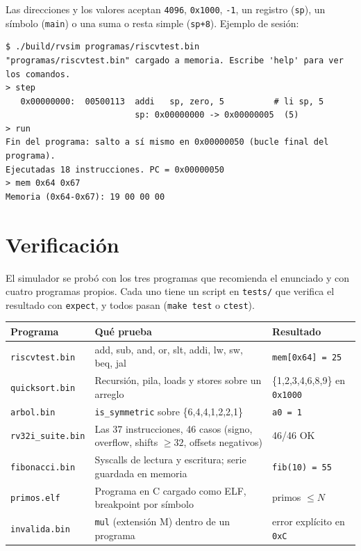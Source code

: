 \documentclass[11pt,a4paper]{article}
\newcommand{\cmd}[1]{\texttt{#1}}
\begin{document}
\noindent Las direcciones y los valores aceptan \cmd{4096}, \cmd{0x1000}, \cmd{-1}, un registro (\cmd{sp}), un
símbolo (\cmd{main}) o una suma o resta simple (\cmd{sp+8}). Ejemplo de sesión:

\begin{lstlisting}
$ ./build/rvsim programas/riscvtest.bin
"programas/riscvtest.bin" cargado a memoria. Escribe 'help' para ver los comandos.
> step
   0x00000000:  00500113  addi   sp, zero, 5          # li sp, 5
                          sp: 0x00000000 -> 0x00000005  (5)
> run
Fin del programa: salto a sí mismo en 0x00000050 (bucle final del programa).
Ejecutadas 18 instrucciones. PC = 0x00000050
> mem 0x64 0x67
Memoria (0x64-0x67): 19 00 00 00
\end{lstlisting}

\section{Verificación}
El simulador se probó con los tres programas que recomienda el enunciado y con cuatro programas propios. Cada uno
tiene un script en \cmd{tests/} que verifica el resultado con \cmd{expect}, y todos pasan
(\cmd{make test} o \cmd{ctest}).

\begin{center}
\begin{tabularx}{\textwidth}{@{}l X l@{}}
\toprule
Programa & Qué prueba & Resultado \\
\midrule
\cmd{riscvtest.bin} & add, sub, and, or, slt, addi, lw, sw, beq, jal & \cmd{mem[0x64] = 25} \\
\cmd{quicksort.bin} & Recursión, pila, loads y stores sobre un arreglo & \{1,2,3,4,6,8,9\} en \cmd{0x1000} \\
\cmd{arbol.bin} & \cmd{is\_symmetric} sobre \{6,4,4,1,2,2,1\} & \cmd{a0 = 1} \\
\cmd{rv32i\_suite.bin} & Las 37 instrucciones, 46 casos (signo, overflow, shifts $\geq 32$, offsets negativos) & 46/46 OK \\
\cmd{fibonacci.bin} & Syscalls de lectura y escritura; serie guardada en memoria & \cmd{fib(10) = 55} \\
\cmd{primos.elf} & Programa en C cargado como ELF, breakpoint por símbolo & primos $\leq N$ \\
\cmd{invalida.bin} & \cmd{mul} (extensión M) dentro de un programa & error explícito en \cmd{0xC} \\
\bottomrule
\end{tabularx}
\end{center}
\end{document}
